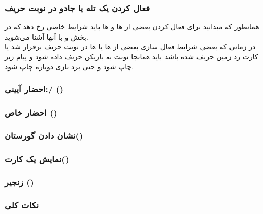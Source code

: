 \documentclass[]{article}
\begin{document}
\subsubsection*{{\titr فعال کردن یک تله یا جادو در نوبت حریف}}
همانطور که میدانید برای فعال کردن بعضی از  ها و  ها باید 
شرایط خاصی رخ دهد که در بخش  و  با آنها آشنا می‌شوید.
\\
در زمانی که بعضی شرایط فعال سازی بعضی از  ها یا  ها در 
نوبت حریف برقرار شد یا کارت  رد زمین حریف  شده باشد 
باید همانجا نوبت به بازیکن حریف داده شود و پیام زیر چاپ شود و حتی برد بازی 
دوباره چاپ شود.

\subsubsection*{{\titr احضار آیینی:/ ()}}


\subsubsection*{{\titr احضار خاص ()}}


\subsubsection*{{\titr نشان دادن گورستان()}}


\subsubsection*{{\titr نمایش یک کارت()}}


\subsubsection*{{\titr زنجیر ()}}


\subsubsection*{{\titr نکات کلی}}
\end{document}

